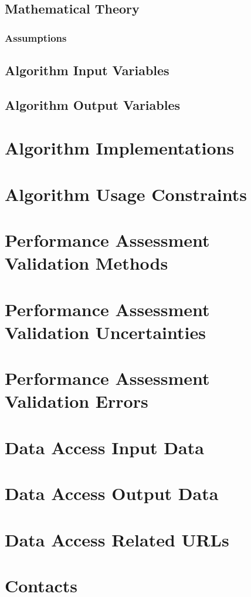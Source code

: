 \subsection{Mathematical Theory}
\MathematicalTheory

\subsubsection{Assumptions}
\MathematicalTheoryAssumptions

\subsection{Algorithm Input Variables}
\AlgorithmInputVariables

\subsection{Algorithm Output Variables}
\AlgorithmOutputVariables

\section{Algorithm Implementations}
\AlgorithmImplementations

\section{Algorithm Usage Constraints}
\AlgorithmUsageConstraints

\section{Performance Assessment Validation Methods}
\PerformanceAssessmentValidationMethods

\section{Performance Assessment Validation Uncertainties}
\PerformanceAssessmentValidationUncertainties

\section{Performance Assessment Validation Errors}
\PerformanceAssessmentValidationErrors

\section{Data Access Input Data}
\DataAccessInputData

\section{Data Access Output Data}
\DataAccessOutputData

\section{Data Access Related URLs}
\DataAccessRelatedUrls

\section{Contacts}
\Contacts





  